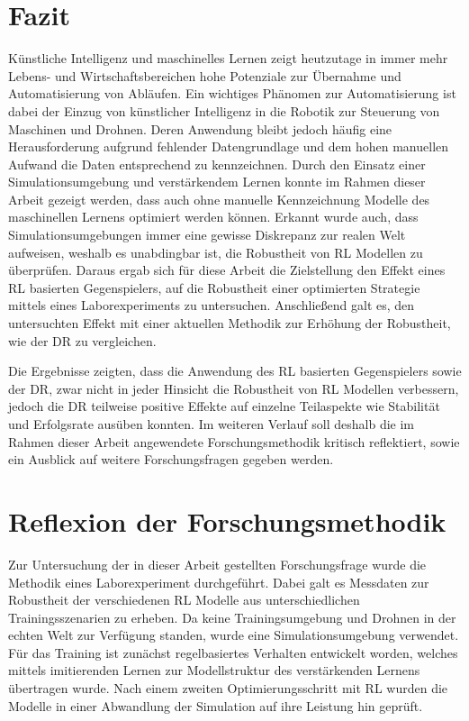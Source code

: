 \section{Fazit}
Künstliche Intelligenz und maschinelles Lernen zeigt heutzutage in immer mehr Lebens- und Wirtschaftsbereichen hohe Potenziale zur Übernahme und Automatisierung von Abläufen.
Ein wichtiges Phänomen zur Automatisierung ist dabei der Einzug von künstlicher Intelligenz in die Robotik zur Steuerung von Maschinen und Drohnen.
Deren Anwendung bleibt jedoch häufig eine Herausforderung aufgrund fehlender Datengrundlage und dem hohen manuellen Aufwand die Daten entsprechend zu kennzeichnen. 
Durch den Einsatz einer Simulationsumgebung und verstärkendem Lernen konnte im Rahmen dieser Arbeit gezeigt werden, dass auch ohne manuelle Kennzeichnung Modelle des maschinellen Lernens optimiert werden können.
Erkannt wurde auch, dass Simulationsumgebungen immer eine gewisse Diskrepanz zur realen Welt aufweisen, weshalb es unabdingbar ist, die Robustheit von RL Modellen zu überprüfen.
Daraus ergab sich für diese Arbeit die Zielstellung den Effekt eines RL basierten Gegenspielers, auf die Robustheit einer optimierten Strategie mittels eines Laborexperiments zu untersuchen.
Anschließend galt es, den untersuchten Effekt mit einer aktuellen Methodik zur Erhöhung der Robustheit, wie der DR zu vergleichen.

Die Ergebnisse zeigten, dass die Anwendung des RL basierten Gegenspielers sowie der DR, zwar nicht in jeder Hinsicht die Robustheit von RL Modellen verbessern, jedoch die DR teilweise positive Effekte auf einzelne Teilaspekte wie Stabilität und Erfolgsrate ausüben konnten.
Im weiteren Verlauf soll deshalb die im Rahmen dieser Arbeit angewendete Forschungsmethodik kritisch reflektiert, sowie ein Ausblick auf weitere Forschungsfragen gegeben werden.

\section{Reflexion der Forschungsmethodik}

Zur Untersuchung der in dieser Arbeit gestellten Forschungsfrage wurde die Methodik eines Laborexperiment durchgeführt. 
Dabei galt es Messdaten zur Robustheit der verschiedenen RL Modelle aus unterschiedlichen Trainingsszenarien zu erheben.
Da keine Trainingsumgebung und Drohnen in der echten Welt zur Verfügung standen, wurde eine Simulationsumgebung verwendet. 
Für das Training ist zunächst regelbasiertes Verhalten entwickelt worden, welches mittels imitierenden Lernen zur Modellstruktur des verstärkenden Lernens übertragen wurde.
Nach einem zweiten Optimierungsschritt mit RL wurden die Modelle in einer Abwandlung der Simulation auf ihre Leistung hin geprüft.

